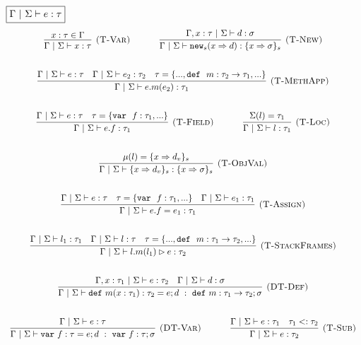 \documentclass{llncs}
\newcommand{\keywadj}[1]{\mathtt{#1}}
\newcommand{\keyw}[1]{\keywadj{#1}~}
\begin{document}
$\fbox{$\Gamma~|~\Sigma \vdash e : \tau$}$
\[
\begin{array}{c}
\infer[\textsc{(T-Var)}]
  {\Gamma~|~\Sigma \vdash x : \tau}
  {x : \tau \in \Gamma}%
~~~~~~~~~~
\infer[\textsc{(T-New)}]
	{\Gamma~|~\Sigma \vdash\keywadj{new}_{s}(x \Rightarrow d) : \{ x \Rightarrow \sigma \}_{s}}
	{\Gamma, x : \tau~|~\Sigma \vdash d : \sigma} \\[5ex]

\infer[\textsc{(T-MethApp)}]
	{\Gamma~|~\Sigma \vdash  e.m(e_2) : \tau_1} 
	{\Gamma~|~\Sigma \vdash e : \tau & \Gamma~|~\Sigma \vdash e_2 : \tau_2 & \tau=\{..., \keyw{def}~ m : \tau_2 \rightarrow \tau_1, ... \} }\\[5ex]

\infer[\textsc{(T-Field)}]
	{\Gamma~|~\Sigma \vdash  e.f : \tau_1} 
	{\Gamma~|~\Sigma \vdash e : \tau & \tau= \{\keyw{var}~ f : \tau_1,... \} }%
~~~~~~~~~~
\infer[\textsc{(T-Loc)}]
  {\Gamma~|~\Sigma \vdash l : \tau_1}
  {\Sigma(l) = \tau_1}\\[5ex]

\infer[\textsc{(T-ObjVal)}]
  {\Gamma~|~\Sigma \vdash \{ x \Rightarrow d_v \}_{s} : \{ x \Rightarrow \sigma \}_{s}}
  {\mu(l) = \{ x \Rightarrow d_v \}_{s}}\\[5ex]

\infer[\textsc{(T-Assign)}]
	{\Gamma~|~\Sigma \vdash  e.f=e_1 : \tau_1} 
	{\Gamma~|~\Sigma \vdash e : \tau & \tau = \{\keyw{var}~ f:\tau_1,... \} & \Gamma~|~\Sigma \vdash e_1 : \tau_1 }\\[5ex]

\infer[\textsc{(T-StackFrames)}]
	{\Gamma~|~\Sigma \vdash l.m(l_1) \rhd e : \tau_2}
	{\Gamma~|~\Sigma \vdash l_1 : \tau_1 & \Gamma~|~\Sigma \vdash l : \tau & \tau = \{..., \keyw{def}~ m : \tau_1 \rightarrow \tau_2, ... \}} \\[5ex]

\infer[\textsc{(DT-Def)}]
  {\Gamma~|~\Sigma \vdash \keyw{def} m(x : \tau_1) : \tau_2 = e; d~:~\keyw{def} m : \tau_1 \rightarrow \tau_2; \sigma}
  {\Gamma, x : \tau_1~|~\Sigma \vdash e : \tau_2 & \Gamma~|~\Sigma \vdash d : \sigma}\\[5ex]

\infer[\textsc{(DT-Var)}]
  {\Gamma~|~\Sigma \vdash \keyw{var} f : \tau = e; d~:~\keyw{var} f : \tau; \sigma}
  {\Gamma~|~\Sigma \vdash e : \tau}%
~~~~~~~~~~
\infer[\textsc{(T-Sub)}]
  {\Gamma~|~\Sigma \vdash e : \tau_2}
  {\Gamma~|~\Sigma \vdash e : \tau_1 & \tau_1 <: \tau_2}\\[5ex]

\end{array}
\]
\end{document}
